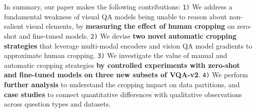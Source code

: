 In summary, our paper makes the following contributions: \texttt{1)} We address a fundamental weakness of visual QA models being unable to reason about non-salient visual elements, by \textbf{measuring the effect of human cropping} on zero-shot and fine-tuned models. \texttt{2)} We devise \textbf{two novel automatic cropping strategies} that leverage multi-modal encoders and vision QA model gradients to approximate human cropping. \texttt{3)} We investigate the value of manual and automatic cropping strategies \textbf{by controlled experiments with zero-shot and fine-tuned models on three new subsets of VQA-v2}. \texttt{4)} We perform \textbf{further analysis} to understand the cropping impact on data partitions, and \textbf{case studies} to connect quantitative differences with qualitative observations across question types and datasets.






